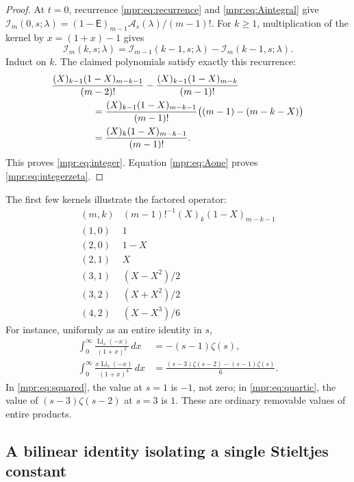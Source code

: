\begin{proof}
At $t=0$, recurrence \eqref{mpr:eq:recurrence} and
\eqref{mpr:eq:Aintegral} give
$\mathcal I_m(0,s;\lambda)
=(1-\mathsf E)_{m-1}\mathcal A_s(\lambda)/(m-1)!$.
For $k\ge1$, multiplication of the kernel by
$x=(1+x)-1$ gives
\[
 \mathcal I_m(k,s;\lambda)
  =\mathcal I_{m-1}(k-1,s;\lambda)
                -\mathcal I_m(k-1,s;\lambda).
\]
Induct on $k$.  The claimed polynomials satisfy exactly this recurrence:
\begin{align*}
 &\frac{(X)_{k-1}(1-X)_{m-k-1}}{(m-2)!}
  -\frac{(X)_{k-1}(1-X)_{m-k}}{(m-1)!}\\
 &\hspace{15mm}
 =\frac{(X)_{k-1}(1-X)_{m-k-1}}{(m-1)!}
                   \bigl((m-1)-(m-k-X)\bigr)\\
 &\hspace{15mm}
 =\frac{(X)_k(1-X)_{m-k-1}}{(m-1)!}.
\end{align*}
This proves \eqref{mpr:eq:integer}.  Equation
\eqref{mpr:eq:Aone} proves \eqref{mpr:eq:integerzeta}.
\end{proof}

The first few kernels illustrate the factored operator:
\[
\begin{array}{c|c}
 (m,k)&(m-1)!^{-1}(X)_k(1-X)_{m-k-1}\\ \hline
 (1,0)&1\\
 (2,0)&1-X\\
 (2,1)&X\\
 (3,1)&(X-X^2)/2\\
 (3,2)&(X+X^2)/2\\
 (4,2)&(X-X^3)/6
\end{array}
\]
For instance, uniformly as an entire identity in $s$,
\begin{align}
 \int_0^\infty\frac{\operatorname{Li}_s(-x)}{(1+x)^2}\,dx
       &=-(s-1)\zeta(s),\label{mpr:eq:squared}\\
 \int_0^\infty\frac{x\operatorname{Li}_s(-x)}{(1+x)^4}\,dx
       &=\frac{(s-3)\zeta(s-2)-(s-1)\zeta(s)}6.
       \label{mpr:eq:quartic}
\end{align}
In \eqref{mpr:eq:squared}, the value at $s=1$ is $-1$, not zero;
in \eqref{mpr:eq:quartic}, the value of $(s-3)\zeta(s-2)$ at $s=3$
is $1$.  These are ordinary removable values of entire products.

\subsection{A bilinear identity isolating a single Stieltjes constant}

